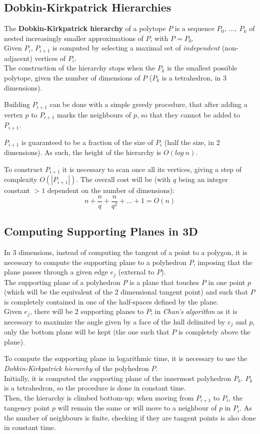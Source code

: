 \documentclass[
12pt,
a4paper,
oneside,
headinclude,
footinclude]{report}
\theoremstyle{definition} %
\begin{document}
\subsection{Dobkin-Kirkpatrick Hierarchies}
The \textbf{Dobkin-Kirkpatrick hierarchy} of a polytope $P$ is a sequence $P_0,\ \ldots,\ P_k$ of nested increasingly smaller approximations of $P$, with $P = P_0$.\\
Given $P_i$, $P_{i+1}$ is computed by selecting a maximal set of \textit{independent} (non-adjacent) vertices of $P_i$.\\
The construction of the hierarchy stops when the $P_k$ is the smallest possible polytope, given the number of dimensions of $P$ ($P_k$ is a tetrahedron, in 3 dimensions).

Building $P_{i+1}$ can be done with a simple greedy procedure, that after adding a vertex $p$ to $P_{i+1}$ marks the neighbours of $p$, so that they cannot be added to $P_{i+1}$.

$P_{i+1}$ is guaranteed to be a fraction of the size of $P_i$ (half the size, in 2 dimensions). As such, the height of the hierarchy is $O(log\ n)$.

To construct $P_{i+1}$ it is necessary to scan once all its vertices, giving a step of complexity $O(|P_{i+1}|)$.
The overall cost will be (with $q$ being an integer constant $>1$ dependent on the number of dimensions):
$$n + \frac{n}{q} + \frac{n}{q^2} + \ldots + 1 = O(n)$$

\subsection{Computing Supporting Planes in 3D}
In 3 dimensions, instead of computing the tangent of a point to a polygon, it is necessary to compute the supporting plane to a polyhedron $P$, imposing that the plane passes through a given edge $e_j$ (external to $P$). \\
The supporting plane of a polyhedron $P$ is a plane that touches $P$ in one point $p$ (which will be the equivalent of the 2 dimensional tangent point) and such that $P$ is completely contained in one of the half-spaces defined by the plane. \\
Given $e_j$, there will be 2 supporting planes to $P$; in \textit{Chan's algorithm} as it is necessary to maximize the angle given by a face of the hull delimited by $e_j$ and $p$, only the bottom plane will be kept (the one such that $P$ is completely above the plane).

To compute the supporting plane in logarithmic time, it is necessary to use the \textit{Dobkin-Kirkpatrick hierarchy} of the polyhedron $P$.\\
Initially, it is computed the supporting plane of the innermost polyhedron $P_k$. $P_k$ is a tetrahedron, so the procedure is done in constant time.\\
Then, the hierarchy is climbed bottom-up: when moving from $P_{i+1}$ to $P_i$, the tangency point $p$ will remain the same or will move to a neighbour of $p$ in $P_i$. As the number of neighbours is finite, checking if they are tangent points is also done in constant time.
\end{document}
